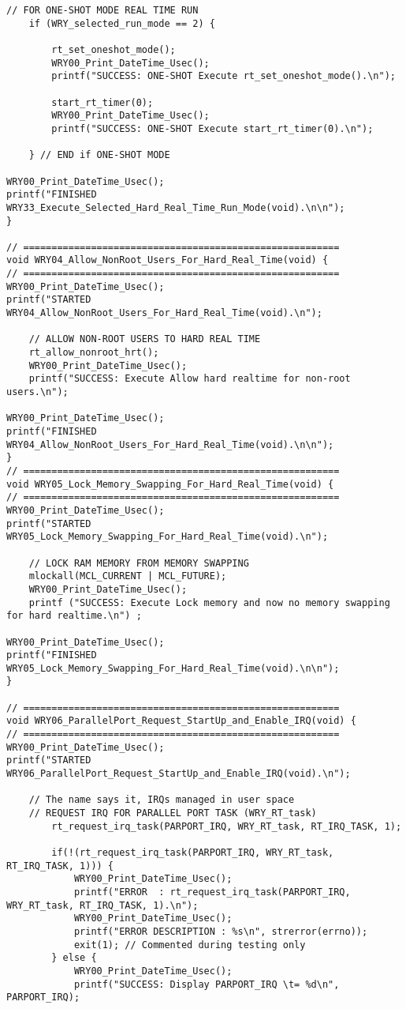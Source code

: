 \begin{lstlisting}[caption={App4-Full C-Code listing for Real Time (RTAI)}, label=App4-Full C-Code listing for Real Time (RTAI)]
	// FOR ONE-SHOT MODE REAL TIME RUN
	if (WRY_selected_run_mode == 2) {
	
		rt_set_oneshot_mode();
		WRY00_Print_DateTime_Usec();
		printf("SUCCESS: ONE-SHOT Execute rt_set_oneshot_mode().\n");
		
		start_rt_timer(0);
		WRY00_Print_DateTime_Usec();
		printf("SUCCESS: ONE-SHOT Execute start_rt_timer(0).\n");
	
	} // END if ONE-SHOT MODE

WRY00_Print_DateTime_Usec(); 
printf("FINISHED WRY33_Execute_Selected_Hard_Real_Time_Run_Mode(void).\n\n");
}

// ========================================================
void WRY04_Allow_NonRoot_Users_For_Hard_Real_Time(void) {
// ========================================================
WRY00_Print_DateTime_Usec(); 
printf("STARTED  WRY04_Allow_NonRoot_Users_For_Hard_Real_Time(void).\n");

	// ALLOW NON-ROOT USERS TO HARD REAL TIME
	rt_allow_nonroot_hrt();
	WRY00_Print_DateTime_Usec();
	printf("SUCCESS: Execute Allow hard realtime for non-root users.\n");

WRY00_Print_DateTime_Usec(); 
printf("FINISHED WRY04_Allow_NonRoot_Users_For_Hard_Real_Time(void).\n\n");
}
// ========================================================
void WRY05_Lock_Memory_Swapping_For_Hard_Real_Time(void) {
// ========================================================
WRY00_Print_DateTime_Usec(); 
printf("STARTED  WRY05_Lock_Memory_Swapping_For_Hard_Real_Time(void).\n");

	// LOCK RAM MEMORY FROM MEMORY SWAPPING
	mlockall(MCL_CURRENT | MCL_FUTURE);
	WRY00_Print_DateTime_Usec();
	printf ("SUCCESS: Execute Lock memory and now no memory swapping for hard realtime.\n") ;

WRY00_Print_DateTime_Usec(); 
printf("FINISHED WRY05_Lock_Memory_Swapping_For_Hard_Real_Time(void).\n\n");
}

// ========================================================
void WRY06_ParallelPort_Request_StartUp_and_Enable_IRQ(void) {
// ========================================================
WRY00_Print_DateTime_Usec(); 
printf("STARTED  WRY06_ParallelPort_Request_StartUp_and_Enable_IRQ(void).\n");

	// The name says it, IRQs managed in user space
	// REQUEST IRQ FOR PARALLEL PORT TASK (WRY_RT_task)
		rt_request_irq_task(PARPORT_IRQ, WRY_RT_task, RT_IRQ_TASK, 1);
	
		if(!(rt_request_irq_task(PARPORT_IRQ, WRY_RT_task, RT_IRQ_TASK, 1))) {
			WRY00_Print_DateTime_Usec();
			printf("ERROR  : rt_request_irq_task(PARPORT_IRQ, WRY_RT_task, RT_IRQ_TASK, 1).\n");
			WRY00_Print_DateTime_Usec();
			printf("ERROR DESCRIPTION : %s\n", strerror(errno));
			exit(1); // Commented during testing only
		} else {
			WRY00_Print_DateTime_Usec();
			printf("SUCCESS: Display PARPORT_IRQ \t= %d\n", PARPORT_IRQ);
			

\end{lstlisting}
